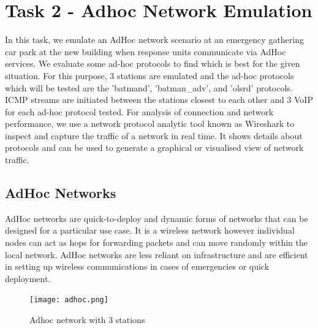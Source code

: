 \documentclass{article}
\begin{document}
\newpage
\section{Task 2 - Adhoc Network Emulation}
In this task, we emulate an AdHoc network scenario at an emergency gathering car park at the new building when response units communicate via AdHoc services. We evaluate some ad-hoc protocols to find which is best for the given situation. For this purpose, 3 stations are emulated and the ad-hoc protocols which will be tested are the 'batmand', 'batman\_adv', and 'olsrd' protocols. ICMP streams are initiated between the stations closest to each other and 3 VoIP for each ad-hoc protocol tested. For analysis of connection and network performance, we use a network protocol analytic tool known as Wireshark to inspect and capture the traffic of a network in real time. It shows details about protocols and can be used to generate a graphical or visualised view of network traffic.
\subsection{AdHoc Networks}
AdHoc \citep{1010101} networks are quick-to-deploy and dynamic forms of networks that can be designed for a particular use case. It is a wireless network however individual nodes can act as hops for forwarding packets and can move randomly within the local network. AdHoc networks are less reliant on infrastructure and are efficient in setting up wireless communications in cases of emergencies or quick deployment.
    	\begin{figure}[h]
        		\centering
        		\texttt{[image: adhoc.png]}
        		\caption{Adhoc network with 3 stations}
        		\label{fig:t2-1}
    	\end{figure}
\end{document}
